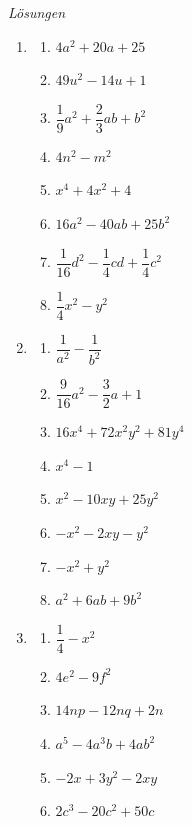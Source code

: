 \clearpage
\emph{Lösungen}
\begin{enumerate}
    \item
          \begin{enumerate}
              \item \(4a^2+20a+25\)
              \item \(49u^2-14u+1\)
              \item \(\dfrac{1}{9}a^2+\dfrac{2}{3}ab+b^2\)
              \item \(4n^2-m^2\)
              \item \(x^4+4x^2+4\)
              \item \(16a^2-40ab+25b^2\)
              \item \(\dfrac{1}{16}d^2-\dfrac{1}{4}cd+\dfrac{1}{4}c^2\)
              \item \(\dfrac{1}{4}x^2-y^2\)
          \end{enumerate}

    \item
          \begin{enumerate}
              \item \(\dfrac{1}{a^2}-\dfrac{1}{b^2}\)
              \item \(\dfrac{9}{16}a^2-\dfrac{3}{2}a+1\)
              \item \(16x^4+72x^2y^2+81y^4\)
              \item \(x^4-1\)
              \item \(x^2-10xy+25y^2\)
              \item \(-x^2-2xy-y^2\)
              \item \(-x^2+y^2\)
              \item \(a^2+6ab+9b^2\)
          \end{enumerate}

    \item
          \begin{enumerate}
              \item \(\dfrac{1}{4}-x^2\)
              \item \(4e^2-9f^2\)
              \item \(14np-12nq+2n\)
              \item \(a^5-4a^3b+4ab^2\)
              \item \(-2x+3y^2-2xy\)
              \item \(2c^3-20c^2+50c\)
          \end{enumerate}


\end{enumerate}
